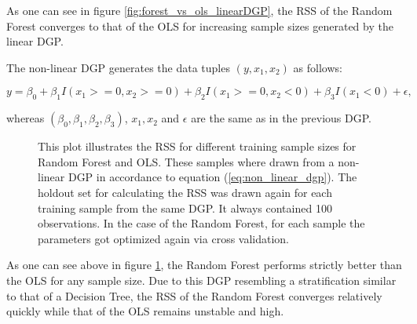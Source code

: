 As one can see in figure \ref{fig:forest_vs_ols_linearDGP}, the RSS of the Random Forest converges
to that of the OLS for increasing sample sizes generated by the linear DGP. 

The non-linear DGP generates the data tuples \( (y, x_{1}, x_{2}) \) as follows:

\begin{equation}\label{eq:non_linear_dgp}
    y = \beta_{0} + \beta_{1} I(x_{1} >= 0, x_{2} >= 0) + \beta_{2} I(x_{1} >= 0, x_{2} < 0) + \beta_{3} I(x_{1} < 0) + \epsilon,
\end{equation}

whereas \( (\beta_{0}, \beta_{1}, \beta_{2}, \beta_{3}) \), \( x_{1}, x_{2} \) and \(  \epsilon \)
are the same as in the previous DGP.

\begin{figure}[H]
    \captionsetup{format=plain}
    \caption
        {This plot illustrates the RSS for different training sample sizes for Random Forest and OLS.
        These samples where drawn from a non-linear DGP in accordance to equation (\ref{eq:non_linear_dgp}).
        The holdout set for calculating the RSS was drawn again for each training sample from the same DGP.
        It always contained 100 observations. In the case of the Random Forest, for each sample the parameters
        got optimized again via cross validation.
        }
    \label{fig:forest_vs_ols_nonLinearDGP}
\end{figure}

As one can see above in figure \ref{fig:forest_vs_ols_nonLinearDGP}, the Random Forest performs strictly better
than the OLS for any sample size. Due to this DGP resembling a stratification similar to
that of a Decision Tree, the RSS of the Random Forest converges relatively quickly while that of the OLS
remains unstable and high. 